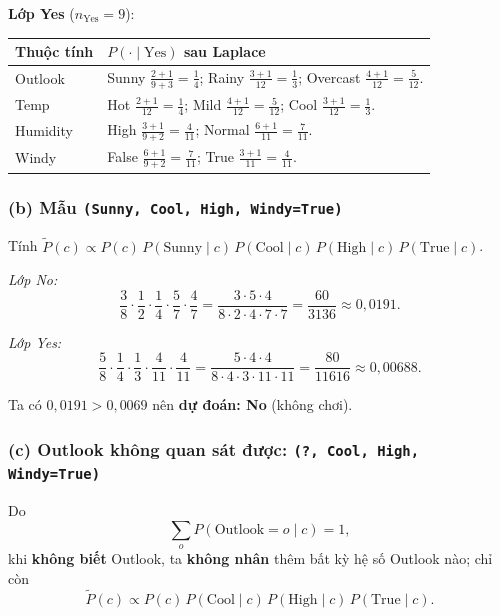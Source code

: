 \noindent\textbf{Lớp Yes} (\(n_{\text{Yes}}=9\)):

\begin{center}
{\small
\begin{tabular}{@{}ll@{}}\toprule
Thuộc tính & \(P(\cdot\mid \text{Yes})\) sau Laplace \\\midrule
Outlook &
  Sunny \(\frac{2+1}{9+3}=\frac14\); Rainy \(\frac{3+1}{12}=\frac13\); Overcast \(\frac{4+1}{12}=\frac{5}{12}\). \\
Temp &
  Hot \(\frac{2+1}{12}=\frac14\); Mild \(\frac{4+1}{12}=\frac{5}{12}\); Cool \(\frac{3+1}{12}=\frac13\). \\
Humidity &
  High \(\frac{3+1}{9+2}=\frac{4}{11}\); Normal \(\frac{6+1}{11}=\frac{7}{11}\). \\
Windy &
  False \(\frac{6+1}{9+2}=\frac{7}{11}\); True \(\frac{3+1}{11}=\frac{4}{11}\). \\
\bottomrule
\end{tabular}
}
\end{center}

\subsubsection*{(b) Mẫu \texttt{(Sunny, Cool, High, Windy=True)}}

Tính \(\tilde P(c)\propto P(c)\,P(\text{Sunny}\mid c)\,P(\text{Cool}\mid c)\,P(\text{High}\mid c)\,P(\text{True}\mid c)\).

\emph{Lớp No:}
\[
\frac{3}{8}\cdot\frac12\cdot\frac14\cdot\frac57\cdot\frac47
=\frac{3\cdot 5\cdot 4}{8\cdot 2\cdot 4\cdot 7\cdot 7}=\frac{60}{3136}\approx 0{,}0191.
\]

\emph{Lớp Yes:}
\[
\frac{5}{8}\cdot\frac14\cdot\frac13\cdot\frac{4}{11}\cdot\frac{4}{11}
=\frac{5\cdot 4\cdot 4}{8\cdot 4\cdot 3\cdot 11\cdot 11}=\frac{80}{11616}\approx 0{,}00688.
\]

Ta có \(0{,}0191>0{,}0069\) nên \textbf{dự đoán: No} (không chơi).

\subsubsection*{(c) Outlook không quan sát được: \texttt{(?, Cool, High, Windy=True)}}

Do
\[
\sum_{o} P(\text{Outlook}=o\mid c)=1,
\]
khi \textbf{không biết} Outlook, ta \textbf{không nhân} thêm bất kỳ hệ số Outlook nào; chỉ còn
\[
\tilde P(c)\propto P(c)\,P(\text{Cool}\mid c)\,P(\text{High}\mid c)\,P(\text{True}\mid c).
\]

